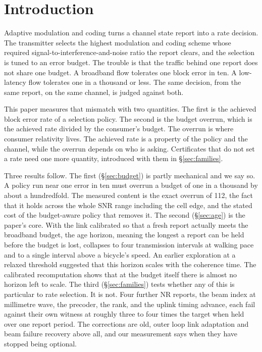 \documentclass[conference]{IEEEtran}
\begin{document}
\section{Introduction}
Adaptive modulation and coding turns a channel state report into a rate decision.
The transmitter selects the highest modulation and coding scheme whose required
signal-to-interference-and-noise ratio the report clears, and the selection is
tuned to an error budget. The trouble is that the traffic behind one report does
not share one budget. A broadband flow tolerates one block error in ten. A
low-latency flow tolerates one in a thousand or less. The same decision, from the
same report, on the same channel, is judged against both.

This paper measures that mismatch with two quantities. The first is the achieved
block error rate of a selection policy. The second is the budget overrun, which
is the achieved rate divided by the consumer's budget. The overrun is where
consumer relativity lives. The achieved rate is a property of the policy and the
channel, while the overrun depends on who is asking. Certificates that do not
set a rate need one more quantity, introduced with them in \S\ref{sec:families}.

Three results follow. The first (\S\ref{sec:budget}) is partly mechanical and we
say so. A policy run near one error in ten must overrun a budget of one in a
thousand by about a hundredfold. The measured content is the exact overrun of
112, the fact that it holds across the whole SNR range including the cell edge,
and the stated cost of the budget-aware policy that removes it. The second
(\S\ref{sec:age}) is the paper's core. With the link calibrated so that a fresh
report actually meets the broadband budget, the age horizon, meaning the longest
a report can be held before the budget is lost, collapses to four transmission
intervals at walking pace and to a single interval above a bicycle's speed. An
earlier exploration at a relaxed threshold suggested that this horizon scales with
the coherence time. The calibrated recomputation shows that at the budget itself
there is almost no horizon left to scale. The third (\S\ref{sec:families}) tests
whether any of this is particular to rate selection. It is not. Four further NR
reports, the beam index at millimetre wave, the precoder, the rank, and the
uplink timing advance, each fail against their own witness at roughly three to
four times the target when held over one report period. The corrections are old, outer
loop link adaptation and beam failure recovery above all, and our measurement says
when they have stopped being optional.
\end{document}
